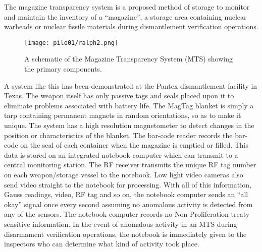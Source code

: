 \documentclass[twoside,titlepage,11pt,twocolumn,a4paper]{article}
\begin{document}
The magazine transparency system is a proposed method of storage to
monitor and maintain the inventory of a ``magazine'', a storage area
containing nuclear warheads or nuclear fissile materials during
dismantlement verification operations.

\begin{figure}
  \texttt{[image: pile01/ralph2.png]}
  \caption{A schematic of the Magazine Transparency System (MTS) 
    showing the primary components. \citep{gerdes2001}}
\end{figure}

A system like this has been demonstrated at the Pantex dismantlement
facility in Texas. The weapon itself has only passive tags and seals
placed upon it to eliminate problems associated with battery life. The
MagTag blanket is simply a tarp containing permanent magnets in random
orientations, so as to make it unique. The system has a high
resolution magnetometer to detect changes in the position or
characteristics of the blanket. The bar-code reader records the
bar-code on the seal of each container when the magazine is emptied or
filled. This data is stored on an integrated notebook computer which
can transmit to a central monitoring station. The RF receiver
transmits the unique RF tag number on each weapon/storage vessel to
the notebook. Low light video cameras also send video straight to the
notebook for processing. With all of this information, Gauss readings,
video, RF tag and so on, the notebook computer sends an ``all okay''
signal once every second assuming no anomalous activity is detected
from any of the sensors. The notebook computer records no Non
Proliferation treaty sensitive information.  In the event of anomalous
activity in an MTS during disarmament verification operations, the
notebook is immediately given to the inspectors who can determine what
kind of activity took place. \citep{gerdes2001}
\end{document}
